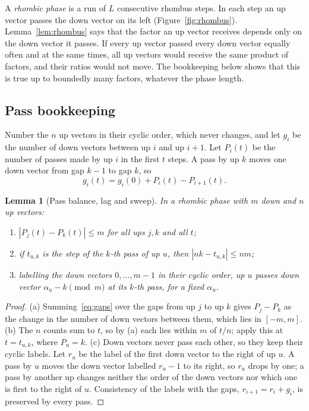 \documentclass[11pt]{amsart}
\newtheorem{lemma}{Lemma}[section]
\theoremstyle{definition}
\begin{document}
A \emph{rhombic phase} is a run of $L$ consecutive rhombus steps. In each step an up vector passes the
down vector on its left (Figure~\ref{fig:rhombus}). Lemma~\ref{lem:rhombus} says that the factor
an up vector receives depends only on the down vector it passes. If every up vector passed every down
vector equally often and at the same times, all up vectors would receive the same product of factors,
and their ratios would not move. The bookkeeping below shows that this is true up to boundedly many
factors, whatever the phase length.

\subsection{Pass bookkeeping} Number the $n$ up vectors in their cyclic order, which never changes, and
let $g_i$ be the number of down vectors between up $i$ and up $i+1$. Let $P_i(t)$ be the number of passes
made by up $i$ in the first $t$ steps. A pass by up $k$ moves one down vector from gap $k-1$ to gap $k$,
so
\begin{equation}\label{eq:gaps}
g_i(t)=g_i(0)+P_i(t)-P_{i+1}(t).
\end{equation}

\begin{lemma}[Pass balance, lag and sweep]\label{lem:passes}
In a rhombic phase with $m$ down and $n$ up vectors:
\begin{enumerate}
\item[(a)] $|P_j(t)-P_k(t)|\le m$ for all ups $j,k$ and all $t$;
\item[(b)] if $t_{u,k}$ is the step of the $k$-th pass of up $u$, then $|nk-t_{u,k}|\le nm$;
\item[(c)] labelling the down vectors $0,\dots,m-1$ in their cyclic order, up $u$ passes down vector
$\alpha_u-k \pmod m$ at its $k$-th pass, for a fixed $\alpha_u$.
\end{enumerate}
\end{lemma}

\begin{proof}
(a) Summing~\eqref{eq:gaps} over the gaps from up $j$ to up $k$ gives $P_j-P_k$ as the change in the
number of down vectors between them, which lies in $[-m,m]$. (b) The $n$ counts sum to $t$, so by (a)
each lies within $m$ of $t/n$; apply this at $t=t_{u,k}$, where $P_u=k$. (c) Down vectors never pass
each other, so they keep their cyclic labels. Let $r_u$ be the label of the first down vector to the
right of up $u$. A pass by $u$ moves the down vector labelled $r_u-1$ to its right, so $r_u$ drops by one;
a pass by another up changes neither the order of the down vectors nor which one is first to the right
of $u$. Consistency of the labels with the gaps, $r_{i+1}=r_i+g_i$, is preserved by every pass.
\end{proof}
\end{document}
